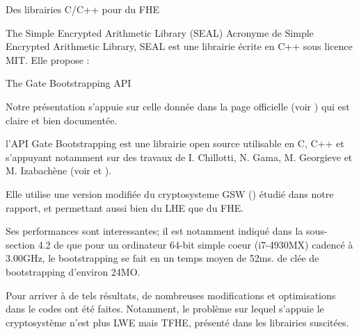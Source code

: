 
\begin{section}{Des librairies C/C++ pour du FHE}
\begin{subsection}{The Simple Encrypted Arithmetic Library (SEAL)}
Acronyme de Simple Encrypted Arithmetic Library, SEAL est une librairie
écrite en C++ sous licence MIT. Elle propose :
\end{subsection}
\begin{subsection}{The Gate Bootstrapping API}
\end{subsection}
Notre présentation s'appuie sur celle donnée dans la page officielle (voir \cite{TFHE})
 qui est claire et bien documentée.

l'API Gate Bootstrapping est une librairie open source utilisable en C, C++ et 
s'appuyant notamment sur des travaux de I. Chillotti, N. Gama, M. Georgieve et M. Izabachène 
(voir \cite{cryptoeprint:2017:430} et  \cite{cryptoeprint:2016:870}). 

Elle utilise une version modifiée du cryptosysteme GSW (\cite{C:GenSahWat13})
étudié dans notre rapport, et permettant aussi bien du LHE que du FHE. 

Ses performances sont interessantes; il est notamment indiqué dans la sous-section
4.2 de \cite{cryptoeprint:2016:870} que pour un ordinateur 64-bit simple coeur 
(i7-4930MX) cadencé à 3.00GHz, le bootstrapping se fait en un temps moyen de 52ms.
de clée de bootstrapping d'environ 24MO.

Pour arriver à de tels résultats, de nombreuses modifications et optimisations dans le codes 
ont été faites. Notamment, le problème sur lequel s'appuie le cryptosystème n'est plus 
LWE mais TFHE, présenté dans les librairies suscitées.
\end{section}
